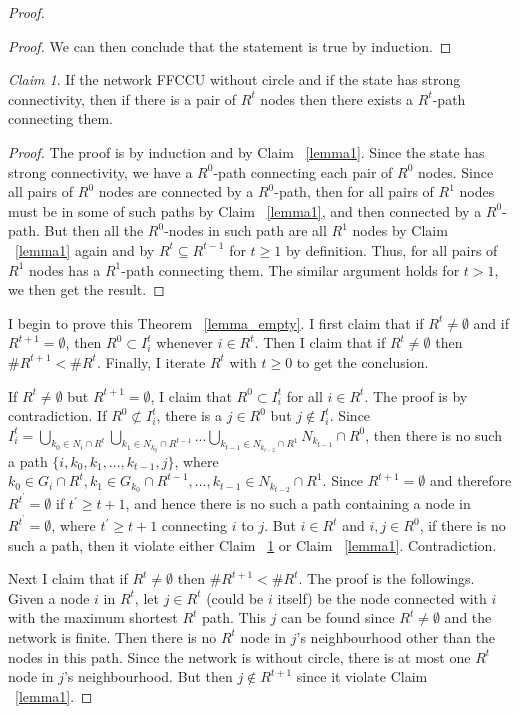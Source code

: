 \documentclass[12pt,letter]{article}
\theoremstyle{definition}
\theoremstyle{remark}
\theoremstyle{claim}
\newtheorem{claim}{Claim}
\begin{document}
\begin{proof}
\begin{proof}
We can then conclude that the statement is true by induction.




\end{proof}



\begin{claim}
\label{lemma_connected}
If the network FFCCU without circle and if the state has strong connectivity, then if there is a pair of $R^{t}$ nodes then there exists a $R^{t}$-path connecting them.
\end{claim}
\begin{proof}
The proof is by induction and by Claim ~\ref{lemma1}. Since the state has strong connectivity, we have a $R^0$-path connecting each pair of $R^0$ nodes. Since all pairs of $R^0$ nodes are connected by a $R^0$-path, then for all pairs of $R^1$ nodes must be in some of such paths by Claim ~\ref{lemma1}, and then connected by a $R^0$-path. But then all the $R^0$-nodes in such path are all $R^1$ nodes by Claim ~\ref{lemma1} again and by $R^t\subseteq R^{t-1}$ for $t\geq 1$ by definition. Thus, for all pairs of $R^1$ nodes has a $R^1$-path connecting them. The similar argument holds for $t> 1$, we then get the result.

\end{proof}
I begin to prove this Theorem ~\ref{lemma_empty}. I first claim that if $R^t\neq \emptyset$ and if $R^{t+1}= \emptyset$, then $R^0\subset I^t_i$ whenever $i\in R^t$. Then I claim that if $R^t\neq \emptyset$ then $\# R^{t+1}<\# R^t$. Finally, I iterate $R^t$ with $t\geq 0$ to get the conclusion.

If $R^t\neq \emptyset$ but $R^{t+1}= \emptyset$, I claim that $R^0\subset I^{t}_i$ for all $i\in R^t$. The proof is by contradiction. If $R^0\not\subset I^{t}_i$, there is a $j\in R^0$ but $j\notin I^t_i$. Since $I^t_i=\bigcup_{k_0\in N_i\cap R^{t}}\bigcup_{k_1\in N_{k_0}\cap R^{t-1}}...\bigcup_{k_{t-1}\in N_{k_{t-2}}\cap R^{1}}N_{k_{t-1}}\cap R^0$, then there is no such a path $\{i,k_0,k_1,...,k_{t-1},j\}$, where $k_0\in G_i\cap R^{t},k_1\in G_{k_0}\cap R^{t-1},...,k_{t-1}\in N_{k_{t-2}}\cap R^{1}$. Since $R^{t+1}=\emptyset$ and therefore $R^{t^{'}}=\emptyset$ if $t^{'}\geq t+1$, and hence there is no such a path containing a node in $R^{t^{'}}=\emptyset$, where $t^{'}\geq t+1$ connecting $i$ to $j$. But $i\in R^t$ and $i,j\in R^0$, if there is no such a path, then it violate either Claim ~\ref{lemma_connected} or Claim ~\ref{lemma1}. Contradiction.

Next I claim that if $R^t\neq \emptyset$ then $\# R^{t+1}<\# R^t$. The proof is the followings. Given a node $i$ in $R^t$, let $j\in R^t$ (could be $i$ itself) be the node connected with $i$ with the maximum shortest $R^t$ path. This $j$ can be found since $R^t\neq \emptyset$ and the network is finite. Then there is no $R^t$ node in $j$'s neighbourhood other than the nodes in this path. Since the network is without circle, there is at most one $R^t$ node in $j$'s neighbourhood. But then $j\notin R^{t+1}$ since it violate Claim ~\ref{lemma1}.


\end{proof}
\end{document}
